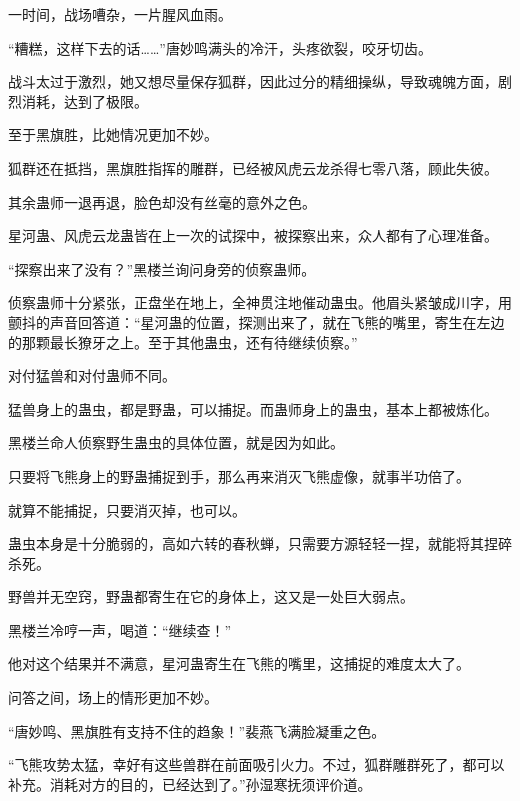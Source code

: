 \begin{this_body}
一时间，战场嘈杂，一片腥风血雨。

“糟糕，这样下去的话……”唐妙鸣满头的冷汗，头疼欲裂，咬牙切齿。

战斗太过于激烈，她又想尽量保存狐群，因此过分的精细操纵，导致魂魄方面，剧烈消耗，达到了极限。

至于黑旗胜，比她情况更加不妙。

狐群还在抵挡，黑旗胜指挥的雕群，已经被风虎云龙杀得七零八落，顾此失彼。

其余蛊师一退再退，脸色却没有丝毫的意外之色。

星河蛊、风虎云龙蛊皆在上一次的试探中，被探察出来，众人都有了心理准备。

“探察出来了没有？”黑楼兰询问身旁的侦察蛊师。

侦察蛊师十分紧张，正盘坐在地上，全神贯注地催动蛊虫。他眉头紧皱成川字，用颤抖的声音回答道：“星河蛊的位置，探测出来了，就在飞熊的嘴里，寄生在左边的那颗最长獠牙之上。至于其他蛊虫，还有待继续侦察。”

对付猛兽和对付蛊师不同。

猛兽身上的蛊虫，都是野蛊，可以捕捉。而蛊师身上的蛊虫，基本上都被炼化。

黑楼兰命人侦察野生蛊虫的具体位置，就是因为如此。

只要将飞熊身上的野蛊捕捉到手，那么再来消灭飞熊虚像，就事半功倍了。

就算不能捕捉，只要消灭掉，也可以。

蛊虫本身是十分脆弱的，高如六转的春秋蝉，只需要方源轻轻一捏，就能将其捏碎杀死。

野兽并无空窍，野蛊都寄生在它的身体上，这又是一处巨大弱点。

黑楼兰冷哼一声，喝道：“继续查！”

他对这个结果并不满意，星河蛊寄生在飞熊的嘴里，这捕捉的难度太大了。

问答之间，场上的情形更加不妙。

“唐妙鸣、黑旗胜有支持不住的趋象！”裴燕飞满脸凝重之色。

“飞熊攻势太猛，幸好有这些兽群在前面吸引火力。不过，狐群雕群死了，都可以补充。消耗对方的目的，已经达到了。”孙湿寒抚须评价道。

\end{this_body}

